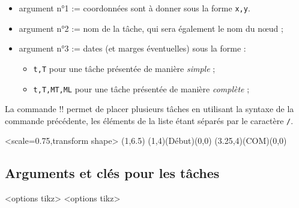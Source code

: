 \documentclass[french,a4paper,11pt]{article}
\begin{document}
{\begin{tipblock}
\begin{itemize}
	\item argument n°1 := coordonnées sont à donner sous la forme \verb!x,y!.
	\item argument n°2 := nom de la tâche, qui sera également le nom du nœud ;
	\item argument n°3 := dates (et marges éventuelles) sous la forme :
	\begin{itemize}
		\item \verb!t,T! pour une tâche présentée de manière \textit{simple} ;
		\item \verb!t,T,MT,ML! pour une tâche présentée de manière \textit{complète} ;
	\end{itemize}
\end{itemize}
\vspace*{-\baselineskip}\leavevmode
\end{tipblock}

\begin{tipblock}
La commande \motcletex!\MPMPlaceTaches! permet de placer plusieurs tâches en utilisant la syntaxe de la commande précédente, les éléments de la liste étant séparés par le caractère \verb!/!.
\end{tipblock}

\begin{DemoCode}[]
\begin{GrapheMPM}[CouleurDates=green/orange,CouleurBords=brown,Grille={18,8}]%
	<scale=0.75,transform shape>
	\MPMPlaceNotice(1,6.5)
	\MPMPlaceTache(1,4)(Début)(0,0)
	\MPMPlaceTache(3.25,4)(COM)(0,0)
\end{GrapheMPM}
\end{DemoCode}

\pagebreak

\subsection{Arguments et clés pour les tâches}

\begin{DemoCode}
\begin{GrapheMPM}[clés]<options tikz>
	<options tikz>
\end{GrapheMPM}
\end{DemoCode}

}
\end{document}
